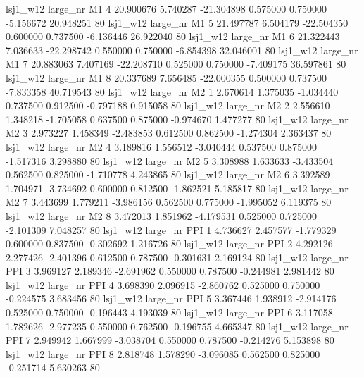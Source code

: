     lsj1_w12   large_nr       M1                 4 20.900676  5.740287 -21.304898 0.575000 0.750000 -5.156672   20.948251 80
    lsj1_w12   large_nr       M1                 5 21.497787  6.504179 -22.504350 0.600000 0.737500 -6.136446   26.922040 80
    lsj1_w12   large_nr       M1                 6 21.322443  7.036633 -22.298742 0.550000 0.750000 -6.854398   32.046001 80
    lsj1_w12   large_nr       M1                 7 20.883063  7.407169 -22.208710 0.525000 0.750000 -7.409175   36.597861 80
    lsj1_w12   large_nr       M1                 8 20.337689  7.656485 -22.000355 0.500000 0.737500 -7.833358   40.719543 80
    lsj1_w12   large_nr       M2                 1  2.670614  1.375035  -1.034440 0.737500 0.912500 -0.797188    0.915058 80
    lsj1_w12   large_nr       M2                 2  2.556610  1.348218  -1.705058 0.637500 0.875000 -0.974670    1.477277 80
    lsj1_w12   large_nr       M2                 3  2.973227  1.458349  -2.483853 0.612500 0.862500 -1.274304    2.363437 80
    lsj1_w12   large_nr       M2                 4  3.189816  1.556512  -3.040444 0.537500 0.875000 -1.517316    3.298880 80
    lsj1_w12   large_nr       M2                 5  3.308988  1.633633  -3.433504 0.562500 0.825000 -1.710778    4.243865 80
    lsj1_w12   large_nr       M2                 6  3.392589  1.704971  -3.734692 0.600000 0.812500 -1.862521    5.185817 80
    lsj1_w12   large_nr       M2                 7  3.443699  1.779211  -3.986156 0.562500 0.775000 -1.995052    6.119375 80
    lsj1_w12   large_nr       M2                 8  3.472013  1.851962  -4.179531 0.525000 0.725000 -2.101309    7.048257 80
    lsj1_w12   large_nr      PPI                 1  4.736627  2.457577  -1.779329 0.600000 0.837500 -0.302692    1.216726 80
    lsj1_w12   large_nr      PPI                 2  4.292126  2.277426  -2.401396 0.612500 0.787500 -0.301631    2.169124 80
    lsj1_w12   large_nr      PPI                 3  3.969127  2.189346  -2.691962 0.550000 0.787500 -0.244981    2.981442 80
    lsj1_w12   large_nr      PPI                 4  3.698390  2.096915  -2.860762 0.525000 0.750000 -0.224575    3.683456 80
    lsj1_w12   large_nr      PPI                 5  3.367446  1.938912  -2.914176 0.525000 0.750000 -0.196443    4.193039 80
    lsj1_w12   large_nr      PPI                 6  3.117058  1.782626  -2.977235 0.550000 0.762500 -0.196755    4.665347 80
    lsj1_w12   large_nr      PPI                 7  2.949942  1.667999  -3.038704 0.550000 0.787500 -0.214276    5.153898 80
    lsj1_w12   large_nr      PPI                 8  2.818748  1.578290  -3.096085 0.562500 0.825000 -0.251714    5.630263 80
